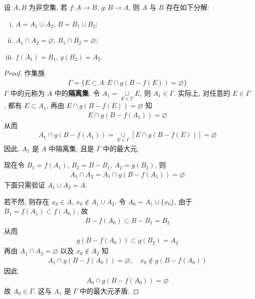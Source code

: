 \documentclass[../../main.tex]{subfiles}
\begin{document}
\begin{lemma}\label{lemma:映射定义域与陪域的无交分解}
设 $A, B$ 为非空集, 若 $f : A \to B$, $g : B \to A$, 则 $A$ 与 $B$ 存在如下分解:
\begin{enumerate}[(i)]
\item $A = A_1 \cup A_2$, $B = B_1 \cup B_2$;
\item $A_1 \cap A_2 = \varnothing$, $B_1 \cap B_2 = \varnothing$;
\item $f(A_1) = B_1$, $g(B_2) = A_2$.
\end{enumerate}
\end{lemma}
\begin{proof}
作集族
\begin{align*}
\Gamma = \{E \subset A : E \cap g(B - f(E)) = \varnothing\}
\end{align*}
$\Gamma$ 中的元称为 $A$ 中的\textbf{隔离集}. 令 $A_1 = \underset{E \in \Gamma}{\cup} E$, 则 $A_1 \in \Gamma$. 实际上, 对任意的 $E \in \Gamma$, 都有 $E \subset A_1$, 再由 $E \cap g(B - f(E)) = \varnothing$ 知
\begin{align*}
E \cap g(B - f(A_1)) = \varnothing
\end{align*}
从而
\begin{align*}
A_1 \cap g(B - f(A_1)) = \underset{E \in \Gamma}{\cup}[E \cap g(B - f(E))] = \varnothing
\end{align*}
因此, $A_1$ 是 $A$ 中隔离集, 且是 $\Gamma$ 中的最大元.

现在令 $B_1 = f(A_1)$, $B_2 = B - B_1$, $A_2 = g(B_2)$, 则
\begin{align*}
A_1 \cap A_2 = A_1 \cap g(B - f(A_1)) = \varnothing
\end{align*}
下面只需验证 $A_1 \cup A_2 = A$.

若不然, 则存在 $x_0 \in A$, $x_0 \notin A_1 \cup A_2$. 令 $A_0 = A_1 \cup \{x_0\}$, 由于 $B_1 = f(A_1) \subset f(A_0)$, 故
\begin{align*}
B - f(A_0) \subset B - B_1 = B_2
\end{align*}
从而
\begin{align*}
g(B - f(A_0)) \subset g(B_2) = A_2
\end{align*}
再由 $A_1 \cap A_2 = \varnothing$ 以及 $x_0 \notin A_2$ 知
\begin{align*}
A_1 \cap g(B - f(A_0)) = \varnothing, \quad x_0 \notin g(B - f(A_0))
\end{align*}
因此
\begin{align*}
A_0 \cap g(B - f(A_0)) = \varnothing
\end{align*}
故 $A_0 \in \Gamma$. 这与 $A_1$ 是 $\Gamma$ 中的最大元矛盾. 

\end{proof}
\end{document}

